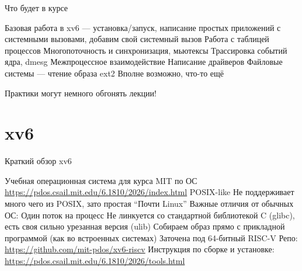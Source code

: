 \documentclass{../../slides-style}
\begin{document}
    \begin{frame}{Что будет в курсе}
        \begin{outline}
            \1 Базовая работа в xv6 --- установка/запуск, написание простых приложений с системными вызовами, добавим свой системный вызов
            \1 Работа с таблицей процессов
            \1 Многопоточность и синхронизация, мьютексы
            \1 Трассировка событий ядра, dmesg
            \1 Межпроцессное взаимодействие
            \1 Написание драйверов
            \1 Файловые системы --- чтение образа ext2
            \1 Вполне возможно, что-то ещё
        \end{outline}
        Практики могут немного обгонять лекции!
    \end{frame}

    \section{xv6}

    \begin{frame}{Краткий обзор xv6}
        \begin{outline}
            \1 Учебная операционная система для курса MIT по ОС
                \2 \url{https://pdos.csail.mit.edu/6.1810/2026/index.html}
            \1 POSIX-like
                \2 Не поддерживает много чего из POSIX, зато простая
                \2 \enquote{Почти Linux}
            \1 Важные отличия от обычных ОС:
                \2 Один поток на процесс
                \2 Не линкуется со стандартной библиотекой C (glibc), есть своя сильно урезанная версия (ulib)
                \2 Собираем образ прямо с прикладной программой (как во встроенных системах)
                \2 Заточена под 64-битный RISC-V
            \1 Репо: \url{https://github.com/mit-pdos/xv6-riscv}
            \1 Инструкция по сборке и установке: \url{https://pdos.csail.mit.edu/6.1810/2026/tools.html}
        \end{outline}
    \end{frame}
\end{document}
